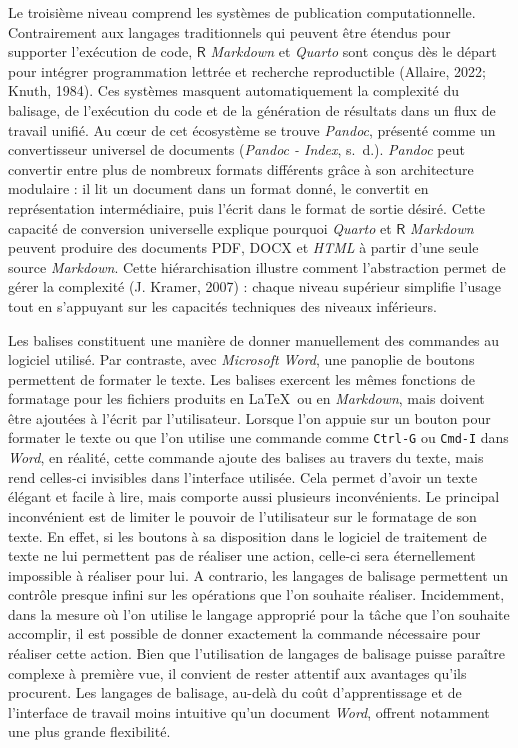 \documentclass[
  letterpaper,
  DIV=11,
  numbers=noendperiod,
  oneside]{scrreprt}
\begin{document}
Le troisième niveau comprend les systèmes de publication
computationnelle. Contrairement aux langages traditionnels qui peuvent
être étendus pour supporter l'exécution de code, \(\textsf{R}\)
\emph{Markdown} et \emph{Quarto} sont conçus dès le départ pour intégrer
programmation lettrée et recherche reproductible (Allaire, 2022; Knuth,
1984). Ces systèmes masquent automatiquement la complexité du balisage,
de l'exécution du code et de la génération de résultats dans un flux de
travail unifié. Au cœur de cet écosystème se trouve \emph{Pandoc},
présenté comme un convertisseur universel de documents (\emph{Pandoc -
Index}, s.~d.). \emph{Pandoc} peut convertir entre plus de nombreux
formats différents grâce à son architecture modulaire : il lit un
document dans un format donné, le convertit en représentation
intermédiaire, puis l'écrit dans le format de sortie désiré. Cette
capacité de conversion universelle explique pourquoi \emph{Quarto} et
\(\textsf{R}\) \emph{Markdown} peuvent produire des documents PDF, DOCX
et \emph{HTML} à partir d'une seule source \emph{Markdown}. Cette
hiérarchisation illustre comment l'abstraction permet de gérer la
complexité (J. Kramer, 2007) : chaque niveau supérieur simplifie l'usage
tout en s'appuyant sur les capacités techniques des niveaux inférieurs.

Les balises constituent une manière de donner manuellement des commandes
au logiciel utilisé. Par contraste, avec \emph{Microsoft Word}, une
panoplie de boutons permettent de formater le texte. Les balises
exercent les mêmes fonctions de formatage pour les fichiers produits en
\LaTeX{}~ou en \emph{Markdown}, mais doivent être ajoutées à l'écrit par
l'utilisateur. Lorsque l'on appuie sur un bouton pour formater le texte
ou que l'on utilise une commande comme \texttt{Ctrl-G} ou \texttt{Cmd-I}
dans \emph{Word}, en réalité, cette commande ajoute des balises au
travers du texte, mais rend celles-ci invisibles dans l'interface
utilisée. Cela permet d'avoir un texte élégant et facile à lire, mais
comporte aussi plusieurs inconvénients. Le principal inconvénient est de
limiter le pouvoir de l'utilisateur sur le formatage de son texte. En
effet, si les boutons à sa disposition dans le logiciel de traitement de
texte ne lui permettent pas de réaliser une action, celle-ci sera
éternellement impossible à réaliser pour lui. A contrario, les langages
de balisage permettent un contrôle presque infini sur les opérations que
l'on souhaite réaliser. Incidemment, dans la mesure où l'on utilise le
langage approprié pour la tâche que l'on souhaite accomplir, il est
possible de donner exactement la commande nécessaire pour réaliser cette
action. Bien que l'utilisation de langages de balisage puisse paraître
complexe à première vue, il convient de rester attentif aux avantages
qu'ils procurent. Les langages de balisage, au-delà du coût
d'apprentissage et de l'interface de travail moins intuitive qu'un
document \emph{Word}, offrent notamment une plus grande flexibilité.
\end{document}
